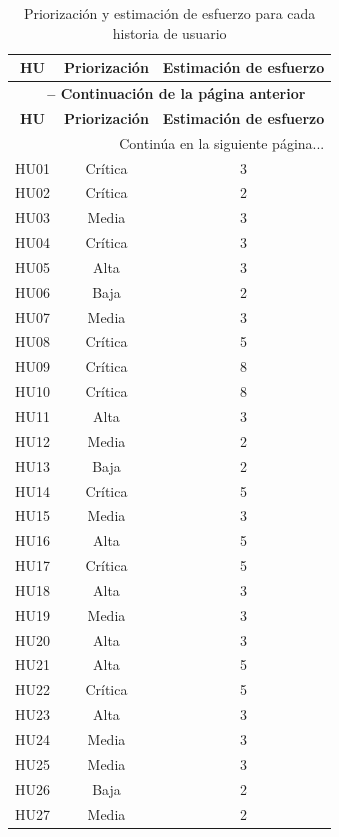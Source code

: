 \documentclass[12pt,letterpaper,oneside]{report}
\begin{document}
\begin{longtable}{|c|c|c|}
  \caption{Priorización y estimación de esfuerzo para cada historia de usuario} \label{tab:prioridad}\\
  \hline
  \textbf{HU} & \textbf{Priorización} & \textbf{Estimación de esfuerzo} \\
  \hline
  \endfirsthead
  \multicolumn{3}{c}{\textbf{\tablename\ \thetable{} -- Continuación de la página anterior}} \\
  \hline
  \textbf{HU} & \textbf{Priorización} & \textbf{Estimación de esfuerzo} \\
  \hline
  \endhead
  \hline
  \multicolumn{3}{|r|}{Continúa en la siguiente página...} \\
  \hline
  \endfoot
  \hline
  \endlastfoot
  HU01 & Crítica & 3 \\ \hline
  HU02 & Crítica & 2 \\ \hline
  HU03 & Media & 3 \\ \hline
  HU04 & Crítica & 3 \\ \hline
  HU05 & Alta & 3 \\ \hline
  HU06 & Baja & 2 \\ \hline
  HU07 & Media & 3 \\ \hline
  HU08 & Crítica & 5 \\ \hline
  HU09 & Crítica & 8 \\ \hline
  HU10 & Crítica & 8 \\ \hline
  HU11 & Alta & 3 \\ \hline
  HU12 & Media & 2 \\ \hline
  HU13 & Baja & 2 \\ \hline
  HU14 & Crítica & 5 \\ \hline
  HU15 & Media & 3 \\ \hline
  HU16 & Alta & 5 \\ \hline
  HU17 & Crítica & 5 \\ \hline
  HU18 & Alta & 3 \\ \hline
  HU19 & Media & 3 \\ \hline
  HU20 & Alta & 3 \\ \hline
  HU21 & Alta & 5 \\ \hline
  HU22 & Crítica & 5 \\ \hline
  HU23 & Alta & 3 \\ \hline
  HU24 & Media & 3 \\ \hline
  HU25 & Media & 3 \\ \hline
  HU26 & Baja & 2 \\ \hline
  HU27 & Media & 2 \\ \hline

\end{longtable}
\end{document}
